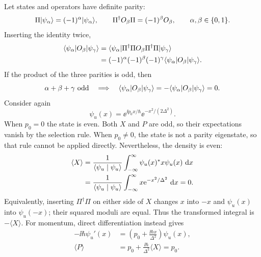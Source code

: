 Let states and operators have definite parity:
\[
 \Pi\lvert \psi_\alpha\rangle=(-1)^\alpha\lvert \psi_\alpha\rangle,\qquad
 \Pi^\dagger O_\beta\Pi=(-1)^\beta O_\beta,\qquad
 \alpha,\beta\in\{0,1\}.
\]
Inserting the identity twice,
\begin{align*}
 \langle \psi_\alpha\rvert O_\beta\lvert \psi_\gamma\rangle
 &=\langle \psi_\alpha\rvert \Pi^\dagger\Pi O_\beta\Pi^\dagger\Pi\lvert \psi_\gamma\rangle\\
 &=(-1)^\alpha(-1)^\beta(-1)^\gamma
       \langle \psi_\alpha\rvert O_\beta\lvert \psi_\gamma\rangle.
\end{align*}
If the product of the three parities is odd, then
\[
 \alpha+\beta+\gamma\ \hbox{odd}
 \quad\Longrightarrow\quad
 \langle \psi_\alpha\rvert O_\beta\lvert \psi_\gamma\rangle
 =-\langle \psi_\alpha\rvert O_\beta\lvert \psi_\gamma\rangle=0.
\]
Consider again
\[
 \psi_u(x)=\ee^{\ii p_0x/\hbar}\ee^{-x^2/(2\Delta^2)}.
\]
When $p_0=0$ the state is even. Both $X$ and $P$ are odd, so their
expectations vanish by the selection rule.
When $p_0\ne0$, the state is not a parity eigenstate, so that rule cannot
be applied directly. Nevertheless, the density is even:
\begin{align*}
 \langle X\rangle
 &=\frac1{\langle \psi_u\mid \psi_u\rangle}
       \int_{-\infty}^{\infty}\psi_u(x)^*x\psi_u(x)\,\mathop{}\!\mathrm{d} x\\
 &=\frac1{\langle \psi_u\mid \psi_u\rangle}
       \int_{-\infty}^{\infty}x\mathrm{e}^{-x^2/\Delta^2}\,\mathop{}\!\mathrm{d} x=0.
\end{align*}
Equivalently, inserting $\Pi^\dagger\Pi$ on either side of $X$ changes
$x$ into $-x$ and $\psi_u(x)$ into $\psi_u(-x)$; their squared moduli
are equal. Thus the transformed integral is $-\langle X\rangle$.
For momentum, direct differentiation instead gives
\begin{align*}
 -\ii\hbar\psi_u'(x)
 &=\left(p_0+\frac{\ii\hbar x}{\Delta^2}\right)\psi_u(x),\\
 \langle P\rangle&=p_0+\frac{\ii\hbar}{\Delta^2}\langle X\rangle=p_0.
\end{align*}
